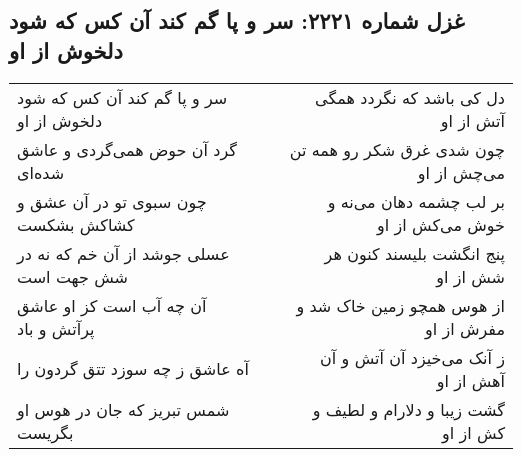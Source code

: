 \begin{center}
\section*{غزل شماره ۲۲۲۱: سر و پا گم کند آن کس که شود دلخوش از او}
\label{sec:2221}
\begin{longtable}{l p{0.5cm} r}
سر و پا گم کند آن کس که شود دلخوش از او
&&
دل کی باشد که نگردد همگی آتش از او
\\
گرد آن حوض همی‌گردی و عاشق شده‌ای
&&
چون شدی غرق شکر رو همه تن می‌چش از او
\\
چون سبوی تو در آن عشق و کشاکش بشکست
&&
بر لب چشمه دهان می‌نه و خوش می‌کش از او
\\
عسلی جوشد از آن خم که نه در شش جهت است
&&
پنج انگشت بلیسند کنون هر شش از او
\\
آن چه آب است کز او عاشق پرآتش و باد
&&
از هوس همچو زمین خاک شد و مفرش از او
\\
آه عاشق ز چه سوزد تتق گردون را
&&
ز آنک می‌خیزد آن آتش و آن آهش از او
\\
شمس تبریز که جان در هوس او بگریست
&&
گشت زیبا و دلارام و لطیف و کش از او
\\
\end{longtable}
\end{center}
